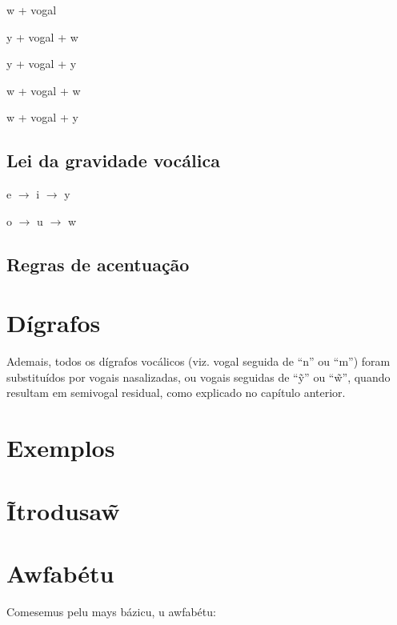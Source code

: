 \documentclass[12pt, a5paper, titlepage]{article}
\begin{document}
\begin{bilingualpages}
    w + vogal

    y + vogal + w

    y + vogal + y

    w + vogal + w

    w + vogal + y

    \subsection{Lei da gravidade vocálica}
    e $\rightarrow$ i $\rightarrow$ y

    o $\rightarrow$ u $\rightarrow$ w

    \subsection{Regras de acentuação}


    \section{Dígrafos}
    \PtTableDigraphs

    Ademais, todos os dígrafos vocálicos (viz. vogal seguida de ``n'' ou ``m'')
    foram substituídos por vogais nasalizadas, ou vogais seguidas de ``\~y'' ou
    ``\~w'', quando resultam em semivogal residual, como explicado no capítulo
    anterior.

    \section{Exemplos}

    \leftpage
    \section{Ĩtrodusa\~w}

    \newpage
    \section{Awfabétu}
    Comesemus pelu mays bázicu, u awfabétu: \BrTableAbc


\end{bilingualpages}
\end{document}
